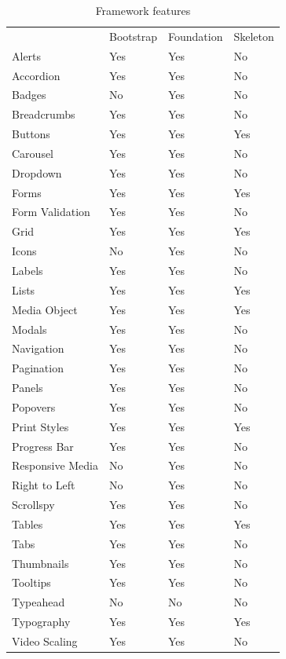\newpage
\begin{table}[!ht]
\centering
\caption{Framework features}
\label{features}
\begin{tabular}{llll}
 & Bootstrap & Foundation & Skeleton \\
Alerts & Yes & Yes & No \\
Accordion & Yes & Yes & No \\
Badges & No & Yes & No \\
Breadcrumbs & Yes & Yes & No \\
Buttons & Yes & Yes & Yes \\
Carousel & Yes & Yes & No \\
Dropdown & Yes & Yes & No \\
Forms & Yes & Yes & Yes \\
Form Validation & Yes & Yes & No \\
Grid & Yes & Yes & Yes \\
Icons & No & Yes & No \\
Labels & Yes & Yes & No \\
Lists & Yes & Yes & Yes \\
Media Object & Yes & Yes & Yes \\
Modals & Yes & Yes & No \\
Navigation & Yes & Yes & No \\
Pagination & Yes & Yes & No \\
Panels & Yes & Yes & No \\
Popovers & Yes & Yes & No \\
Print Styles & Yes & Yes & Yes \\
Progress Bar & Yes & Yes & No \\
Responsive Media & No & Yes & No \\
Right to Left & No & Yes & No \\
Scrollspy & Yes & Yes & No \\
Tables & Yes & Yes & Yes \\
Tabs & Yes & Yes & No \\
Thumbnails & Yes & Yes & No \\
Tooltips & Yes & Yes & No \\
Typeahead & No & No & No \\
Typography & Yes & Yes & Yes \\
Video Scaling & Yes & Yes & No
\end{tabular}
\end{table}


